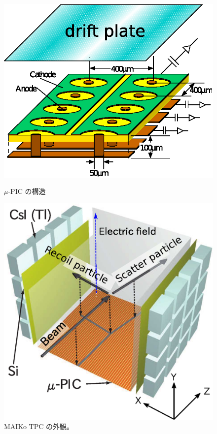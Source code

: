 \documentclass{jps-cp}
\begin{document}
\begin{figure}
  \centering
  \begin{minipage}{0.4\columnwidth}
    \centering
    \includegraphics[clip, width=0.9\columnwidth]{eps/upic_struc.eps}
    \caption{$\mu$-PIC の構造}
    \label{fig:uPIC}
  \end{minipage}
  \hfill
  \begin{minipage}{0.4\columnwidth}
    \centering
    \includegraphics[clip, width=0.9\columnwidth]{eps/MAIKo.eps}
    \caption{MAIKo TPC の外観。}
    \label{fig:MAIKo}
  \end{minipage}
\end{figure}
\end{document}
